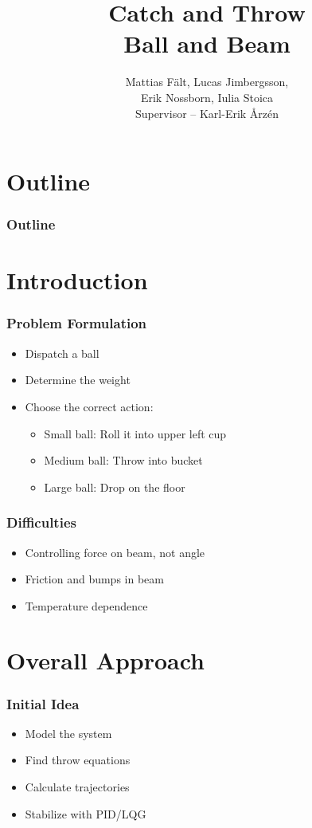 \documentclass[
compress]
{beamer}
\title[Catch and Throw]{Catch and Throw\\Ball and Beam}
\author[]{Mattias Fält, Lucas Jimbergsson,\\Erik Nossborn, Iulia Stoica\\\vspace{1em}Supervisor -- Karl-Erik Årz\'{e}n}
\begin{document}
\frame{\titlepage}

\section*{Outline}

\frame
{
  \frametitle{Outline}
  \tableofcontents%
}

\section{Introduction}
\frame{\sectionpage}
\begin{frame}
\frametitle{Problem Formulation}
\begin{itemize}
\item Dispatch a ball
\item Determine the weight
\item Choose the correct action:
\begin{itemize}
\item Small ball: Roll it into upper left cup
\item Medium ball: Throw into bucket
\item Large ball: Drop on the floor
\end{itemize}
\end{itemize}
\end{frame}


\begin{frame}
\frametitle{Difficulties}
\begin{itemize}
\item Controlling force on beam, not angle
\item Friction and bumps in beam
\item Temperature dependence
\end{itemize}
\end{frame}

\section{Overall Approach}
\frame{\sectionpage}
\begin{frame}
\frametitle{Initial Idea}
\begin{itemize}
\item Model the system
\item Find throw equations
\item Calculate trajectories
\item Stabilize with PID/LQG
\end{itemize}
\end{frame}
\end{document}
